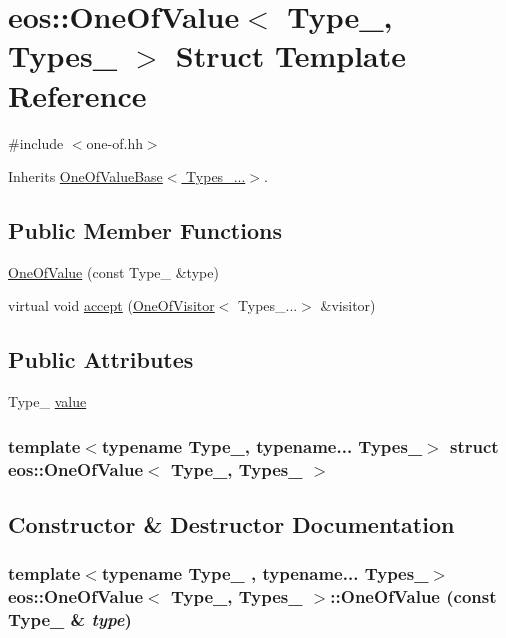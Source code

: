 \hypertarget{structeos_1_1OneOfValue}{
\section{eos::OneOfValue$<$ Type\_\-, Types\_\- $>$ Struct Template Reference}
\label{structeos_1_1OneOfValue}
}


{\ttfamily \#include $<$one-\/of.hh$>$}

Inherits \hyperlink{structeos_1_1OneOfValueBase}{OneOfValueBase$<$ Types\_\-...$>$}.\subsection*{Public Member Functions}
\begin{DoxyCompactItemize}
\item 
\hyperlink{structeos_1_1OneOfValue_a5d443df9b9298a3887921e4872cbf059}{OneOfValue} (const Type\_\- \&type)
\item 
virtual void \hyperlink{structeos_1_1OneOfValue_a280c84a5d3ea4f659297217e7b95a3c2}{accept} (\hyperlink{structeos_1_1OneOfVisitor}{OneOfVisitor}$<$ Types\_\-...$>$ \&visitor)
\end{DoxyCompactItemize}
\subsection*{Public Attributes}
\begin{DoxyCompactItemize}
\item 
Type\_\- \hyperlink{structeos_1_1OneOfValue_a8c495ebdf36bdf308e6ecf85669517e5}{value}
\end{DoxyCompactItemize}
\subsubsection*{template$<$typename Type\_\-, typename... Types\_\-$>$ struct eos::OneOfValue$<$ Type\_\-, Types\_\- $>$}



\subsection{Constructor \& Destructor Documentation}
\hypertarget{structeos_1_1OneOfValue_a5d443df9b9298a3887921e4872cbf059}{
\subsubsection[{OneOfValue}]{\setlength{\rightskip}{0pt plus 5cm}template$<$typename Type\_\- , typename... Types\_\-$>$ {\bf eos::OneOfValue}$<$ Type\_\-, Types\_\- $>$::{\bf OneOfValue} (const Type\_\- \& {\em type})}}
\label{structeos_1_1OneOfValue_a5d443df9b9298a3887921e4872cbf059}


